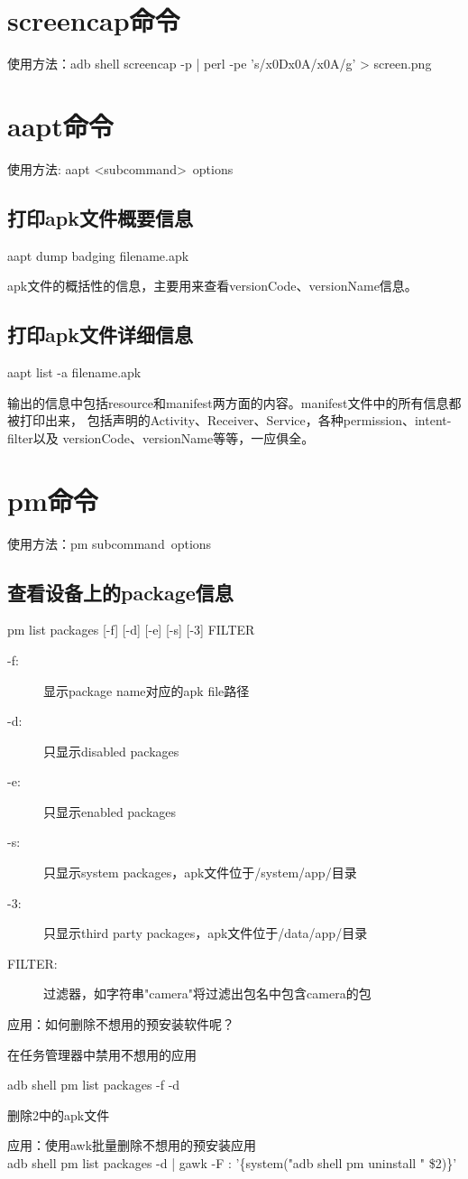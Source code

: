 \section[screencap]{screencap命令}
使用方法：adb shell screencap -p | perl -pe 's/\bs x0D\bs x0A/\bs x0A/g' > screen.png

\section[aapt - Android Asset Packaging Tool]{aapt命令}
使用方法: aapt \textless subcommand\textgreater\ \lt options\gt
\subsection[print apk file badging information]{打印apk文件概要信息}
aapt dump badging filename.apk

apk文件的概括性的信息，主要用来查看versionCode、versionName信息。

\subsection[print apk file verbose information]{打印apk文件详细信息}
aapt list -a filename.apk

输出的信息中包括resource和manifest两方面的内容。manifest文件中的所有信息都被打印出来，
包括声明的Activity、Receiver、Service，各种permission、intent-filter以及
versionCode、versionName等等，一应俱全。

\section[pm - Package Manager]{pm命令}
使用方法：pm \lt subcommand\gt\ \lt options\gt

\subsection[list packages]{查看设备上的package信息}
pm list packages [-f] [-d] [-e] [-s] [-3] FILTER

\begin{description}
\item[-f:] 显示package name对应的apk file路径
\item[-d:] 只显示disabled packages
\item[-e:] 只显示enabled packages
\item[-s:] 只显示system packages，apk文件位于/system/app/目录
\item[-3:] 只显示third party packages，apk文件位于/data/app/目录
\item[FILTER:] 过滤器，如字符串"camera"将过滤出包名中包含camera的包
\end{description}
应用：如何删除不想用的预安装软件呢？
\begin{coloredenumerate}
\item 在任务管理器中禁用不想用的应用
\item adb shell pm list packages -f -d
\item 删除2中的apk文件
\end{coloredenumerate}
应用：使用awk批量删除不想用的预安装应用\\
adb shell pm list packages -d | gawk -F : '\{system("adb shell pm uninstall " \$2)\}'


